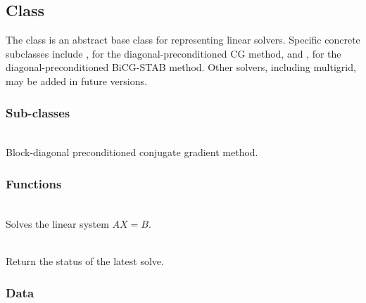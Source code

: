 \documentclass[11pt]{article}
\begin{document}
\subsection{ Class} \label{s:solver}

   The  class is an abstract base class for representing linear
   solvers.  Specific concrete subclasses include , for the
   diagonal-preconditioned CG method, and , for the
   diagonal-preconditioned BiCG-STAB method.  Other solvers, including
   multigrid, may be added in future versions.

\subsubsection{ Sub-classes}

     \\
     Block-diagonal preconditioned conjugate gradient method.

\subsubsection{ Functions}

   \umlSolver

     \\ Solves the linear system $A X = B$.

     \\
    Return the status of the latest solve.

\subsubsection{ Data}
\end{document}
